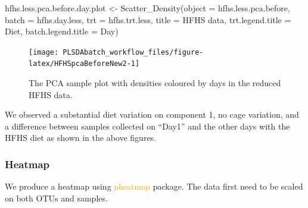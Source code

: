 \documentclass[
]{book}
\newenvironment{Shaded}{\begin{snugshade}}{\end{snugshade}}
\newcommand{\AttributeTok}[1]{\textcolor[rgb]{0.77,0.63,0.00}{#1}}
\newcommand{\FunctionTok}[1]{\textcolor[rgb]{0.00,0.00,0.00}{#1}}
\newcommand{\NormalTok}[1]{#1}
\newcommand{\OtherTok}[1]{\textcolor[rgb]{0.56,0.35,0.01}{#1}}
\newcommand{\StringTok}[1]{\textcolor[rgb]{0.31,0.60,0.02}{#1}}
\begin{document}
\begin{Shaded}
\begin{Highlighting}[]
\NormalTok{hfhs.less.pca.before.day.plot }\OtherTok{\textless{}{-}} 
  \FunctionTok{Scatter\_Density}\NormalTok{(}\AttributeTok{object =}\NormalTok{ hfhs.less.pca.before, }
                  \AttributeTok{batch =}\NormalTok{ hfhs.day.less, }
                  \AttributeTok{trt =}\NormalTok{ hfhs.trt.less, }
                  \AttributeTok{title =} \StringTok{\textquotesingle{}HFHS data\textquotesingle{}}\NormalTok{, }
                  \AttributeTok{trt.legend.title =} \StringTok{\textquotesingle{}Diet\textquotesingle{}}\NormalTok{,}
                  \AttributeTok{batch.legend.title =} \StringTok{\textquotesingle{}Day\textquotesingle{}}\NormalTok{)}
\end{Highlighting}
\end{Shaded}

\begin{figure}

{\centering \texttt{[image: PLSDAbatch\_workflow\_files/figure-latex/HFHSpcaBeforeNew2-1]} 

}

\caption{The PCA sample plot with densities coloured by days in the reduced HFHS data.}\label{fig:HFHSpcaBeforeNew2}
\end{figure}

We observed a substantial diet variation on component 1, no cage variation, and a difference between samples collected on ``Day1'' and the other days with the HFHS diet as shown in the above figures.

\hypertarget{heatmap-2}{%
\subsubsection{Heatmap}\label{heatmap-2}}

We produce a heatmap using \textcolor{orange}{pheatmap} package. The data first need to be scaled on both OTUs and samples.
\end{document}
